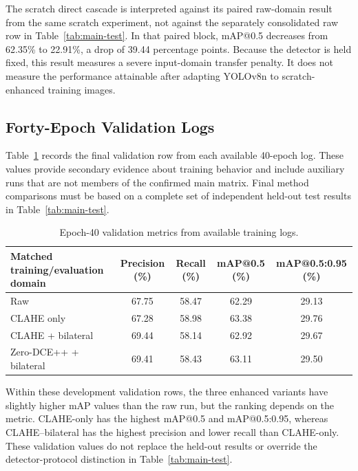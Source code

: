 \documentclass[11pt,a4paper]{article}
\begin{document}
The scratch direct cascade is interpreted against its paired raw-domain result
from the same scratch experiment, not against the separately consolidated raw row in
Table~\ref{tab:main-test}. In that paired block, mAP@0.5 decreases from 62.35\%
to 22.91\%, a drop of 39.44 percentage points. Because the detector is held
fixed, this result measures a severe input-domain transfer penalty. It does not
measure the performance attainable after adapting YOLOv8n to scratch-enhanced
training images.

\subsection{Forty-Epoch Validation Logs}

Table~\ref{tab:validation-e40} records the final validation row from each
available 40-epoch log. These values provide secondary evidence about training
behavior and include auxiliary runs that are not members of the confirmed
main matrix. Final method comparisons must be based on a complete set of
independent held-out test results in Table~\ref{tab:main-test}.

\begin{table}[H]
\centering
\caption{Epoch-40 validation metrics from available training logs.}
\label{tab:validation-e40}
\small
\begin{tabularx}{\textwidth}{>{\raggedright\arraybackslash}Xcccc}
\toprule
Matched training/evaluation domain & Precision (\%) & Recall (\%) & mAP@0.5 (\%) & mAP@0.5:0.95 (\%) \\
\midrule
Raw & 67.75 & 58.47 & 62.29 & 29.13 \\
CLAHE only & 67.28 & 58.98 & 63.38 & 29.76 \\
CLAHE + bilateral & 69.44 & 58.14 & 62.92 & 29.67 \\
Zero-DCE++ + bilateral & 69.41 & 58.43 & 63.11 & 29.50 \\
\bottomrule
\end{tabularx}
\end{table}

Within these development validation rows, the three enhanced variants have
slightly higher mAP values than the raw run, but the ranking depends on the
metric. CLAHE-only has the highest mAP@0.5 and mAP@0.5:0.95, whereas
CLAHE--bilateral has the highest precision and lower recall than CLAHE-only.
These validation values do not replace the held-out results or override the
detector-protocol distinction in Table~\ref{tab:main-test}.
\end{document}
